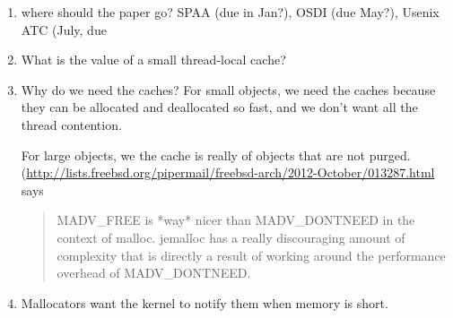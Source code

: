 \begin{enumerate}
 \item where should the paper go?  SPAA (due in Jan?), OSDI (due May?), Usenix ATC (July, due

 \item What is the value of a small thread-local cache?

 \item Why do we need the caches?
  For small objects, we need the caches because they can be allocated and deallocated so fast, and we don't want all the thread contention.

  For large objects, we the cache is really of objects that are not purged.  (\url{http://lists.freebsd.org/pipermail/freebsd-arch/2012-October/013287.html} says 
\begin{quote}
MADV\_FREE is *way* nicer than MADV\_DONTNEED in the context of malloc.  jemalloc has a really discouraging amount of complexity that is directly a result of working around the performance overhead of MADV\_DONTNEED.
\end{quote}
 
 \item Mallocators want the kernel to notify them when memory is short.
\end{enumerate}
